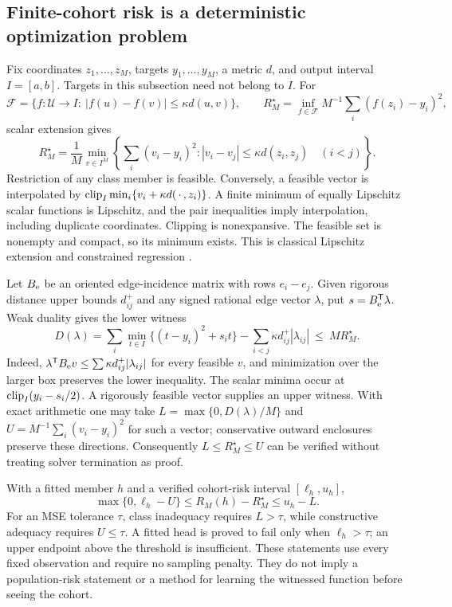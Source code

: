 \subsection{Finite-cohort risk is a deterministic optimization problem}
Fix coordinates $z_1,\ldots,z_M$, targets $y_1,\ldots,y_M$, a metric $d$, and output interval $I=[a,b]$. Targets in this subsection need not belong to $I$. For
\[
\mathcal F=\{f:\mathcal U\to I:\ |f(u)-f(v)|\leq\kappa d(u,v)\},
\qquad
R_M^\star=\inf_{f\in\mathcal F}M^{-1}\sum_i(f(z_i)-y_i)^2,
\]
scalar extension gives
\begin{equation}
R_M^\star=\frac1M\min_{v\in I^M}
\left\{\sum_i(v_i-y_i)^2:
 |v_i-v_j|\leq\kappa d(z_i,z_j)\quad(i<j)\right\}.
\label{eq:cohort}
\end{equation}
Restriction of any class member is feasible. Conversely, a feasible vector is interpolated by
$\operatorname{clip}_I\min_i\{v_i+\kappa d(\,\cdot\,,z_i)\}$.
A finite minimum of equally Lipschitz scalar functions is Lipschitz, and the pair inequalities imply interpolation, including duplicate coordinates. Clipping is nonexpansive. The feasible set is nonempty and compact, so its minimum exists. This is classical Lipschitz extension and constrained regression \citep{gottlieb2017regression}.

Let $B_{\rm e}$ be an oriented edge-incidence matrix with rows $e_i-e_j$. Given rigorous distance upper bounds $d^+_{ij}$ and any signed rational edge vector $\lambda$, put $s=B_{\rm e}^{\mathsf T}\lambda$. Weak duality gives the lower witness
\begin{equation}
D(\lambda)=
\sum_i\min_{t\in I}\{(t-y_i)^2+s_it\}
-\sum_{i<j}\kappa d^+_{ij}|\lambda_{ij}|
\ \leq\ M R_M^\star.
\label{eq:cohortdual}
\end{equation}
Indeed, $\lambda^{\mathsf T}B_{\rm e}v\leq\sum\kappa d^+_{ij}|\lambda_{ij}|$ for every feasible $v$, and minimization over the larger box preserves the lower inequality. The scalar minima occur at $\operatorname{clip}_I(y_i-s_i/2)$. A rigorously feasible vector supplies an upper witness. With exact arithmetic one may take $L=\max\{0,D(\lambda)/M\}$ and $U=M^{-1}\sum_i(v_i-y_i)^2$ for such a vector; conservative outward enclosures preserve these directions. Consequently $L\leq R_M^\star\leq U$ can be verified without treating solver termination as proof.

With a fitted member $h$ and a verified cohort-risk interval $[\ell_h,u_h]$,
\[
\max\{0,\ell_h-U\}\leq R_M(h)-R_M^\star
\leq u_h-L.
\]
For an MSE tolerance $\tau$, class inadequacy requires $L>\tau$, while constructive adequacy requires $U\leq\tau$. A fitted head is proved to fail only when $\ell_h>\tau$; an upper endpoint above the threshold is insufficient. These statements use every fixed observation and require no sampling penalty. They do not imply a population-risk statement or a method for learning the witnessed function before seeing the cohort.

